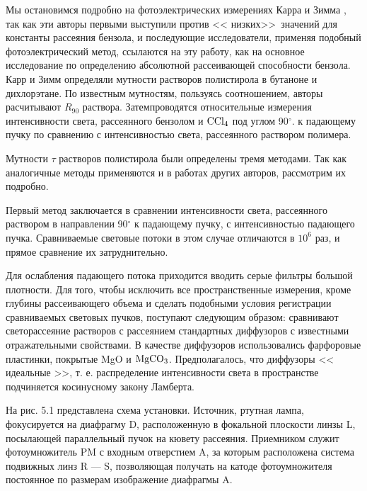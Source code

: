 Мы остановимся подробно на фотоэлектрических измерениях Карра и
Зимма , так как эти авторы первыми выступили против <<
низких>>\ значений для константы рассеяния бензола, и
последующие  исследователи, применяя подобный фотоэлектрический
метод, ссылаются на эту работу, как на основное исследование по
определению абсолютной рассеивающей способности бензола. Карр и
Зимм определяли мутности растворов полистирола в бутаноне и
дихлорэтане. По известным мутностям, пользуясь соотношением,
авторы расчитывают $R_{90}$ раствора. Затемпроводятся
относительные измерения интенсивности света, рассеянного бензолом
и ${\rm CCl_4}$ под углом 90$^{\circ}$. к падающему пучку по
сравнению с интенсивностью света, рассеянного раствором полимера.

Мутности $\tau$ растворов полистирола были определены тремя
методами. Так как аналогичные методы применяются и в работах
других авторов, рассмотрим их подробно.

Первый метод заключается в сравнении интенсивности света,
рассеянного раствором в направлении 90$^{\circ}$ к падающему
пучку, с интенсивностью падающего пучка. Сравниваемые световые
потоки в этом случае отличаются в $10^{6}$ раз, и прямое
сравнение их затруднительно.

Для ослабления падающего потока приходится вводить серые фильтры
большой плотности. Для того, чтобы исключить все пространственные
измерения, кроме глубины рассеивающего объема и сделать подобными
условия регистрации сравниваемых световых пучков, поступают
следующим образом: сравнивают светорассеяние растворов с
рассеянием стандартных диффузоров с известными отражательными
свойствами. В качестве диффузоров использовались фарфоровые
пластинки, покрытые MgO и $\rm MgCO_3$. Предполагалось, что
диффузоры << идеальные >>, т. е. распределение интенсивности
света в пространстве подчиняется косинусному закону Ламберта.

На рис. 5.1 представлена схема установки. Источник, ртутная
лампа, фокусируется на диафрагму D, расположенную в фокальной
плоскости линзы L, посылающей параллельный пучок на кювету
рассеяния. Приемником служит фотоумножитель PM с входным
отверстием A, за которым расположена система подвижных линз R ---
S, позволяющая получать на катоде фотоумножителя постоянное по
размерам изображение диафрагмы A.

